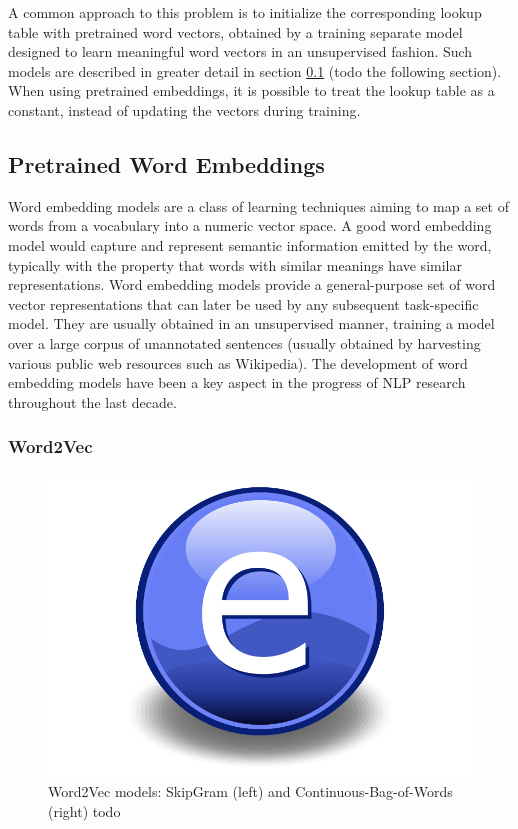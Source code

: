 A common approach to this problem is to initialize the corresponding lookup table with pretrained word vectors, obtained by a training separate model designed to learn meaningful word vectors in an unsupervised fashion. Such models are described in greater detail in section \ref{section:wordembeddings} (todo the following section). When using pretrained embeddings, it is possible to treat the lookup table as a constant, instead of updating the vectors during training. 

\subsection{Pretrained Word Embeddings} \label{section:wordembeddings}
Word embedding models are a class of learning techniques aiming to map a set of words from a vocabulary into a numeric vector space. A good word embedding model would capture and represent semantic information emitted by the word, typically with the property that words with similar meanings have similar representations. Word embedding models provide a general-purpose set of word vector representations that can later be used by any subsequent task-specific model. They are usually obtained in an unsupervised manner, training a model over a large corpus of unannotated sentences (usually obtained by harvesting various public web resources such as Wikipedia). The development of word embedding models have been a key aspect in the progress of NLP research throughout the last decade.

\subsubsection{Word2Vec}

\begin{figure}
    \centering
    \includegraphics{Figures/Electron.pdf}
    \caption{Word2Vec models: SkipGram (left) and Continuous-Bag-of-Words (right) todo}
    \label{fig:word2vec}
\end{figure}

